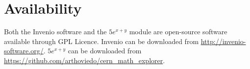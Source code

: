 \documentclass{sig-alternate}
\begin{document}
\section{Availability}
Both the Invenio software and the $5e^{x+y}$ module are open-source software available through GPL Licence. Invenio can be downloaded from \url{http://invenio-software.org/}. $5e^{x+y}$ can be downloaded from \\ \url{https://github.com/arthoviedo/cern_math_explorer}. 

%

%
%
\end{document}
